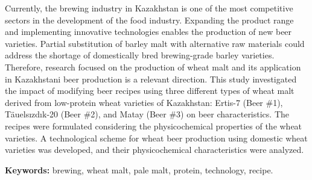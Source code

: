 Currently, the brewing industry in Kazakhstan is one of the most
competitive sectors in the development of the food industry. Expanding
the product range and implementing innovative technologies enables the
production of new beer varieties. Partial substitution of barley malt
with alternative raw materials could address the shortage of
domestically bred brewing-grade barley varieties. Therefore, research
focused on the production of wheat malt and its application in
Kazakhstani beer production is a relevant direction. This study
investigated the impact of modifying beer recipes using three different
types of wheat malt derived from low-protein wheat varieties of
Kazakhstan: Ertis-7 (Beer \#1), Täuelsızdık-20 (Beer \#2), and Matay
(Beer \#3) on beer characteristics. The recipes were formulated
considering the physicochemical properties of the wheat varieties. A
technological scheme for wheat beer production using domestic wheat
varieties was developed, and their physicochemical characteristics were
analyzed.

{\bfseries Keywords:} brewing, wheat malt, pale malt, protein, technology,
recipe.

